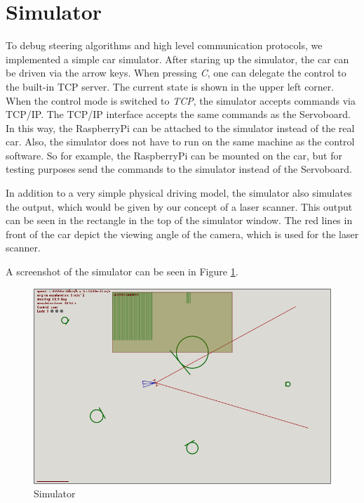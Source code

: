 \documentclass[a4paper
               ,10pt
               ,DIV=10 %
               ,BCOR=0.3cm
               ,pagesize %
               ,headings=small
               ,bibtotoc
               ]
               {scrartcl}
\begin{document}
\section{Simulator}

To debug steering algorithms and high level communication protocols, we implemented a simple car simulator.
After staring up the simulator, the car can be driven via the arrow keys. When pressing \textit{C}, one can delegate the control to the built-in TCP server. The current state is shown in the upper left corner.
When the control mode is switched to \textit{TCP}, the simulator accepts commands via TCP/IP.
The TCP/IP interface accepts the same commands as the Servoboard.
In this way, the RaspberryPi can be attached to the simulator instead of the real car.
Also, the simulator does not have to run on the same machine as the control software.
So for example, the RaspberryPi can be mounted on the car, but for testing purposes send the commands to the simulator instead of the Servoboard.

In addition to a very simple physical driving model, the simulator also simulates the output, which would be given by our concept of a laser scanner. This output can be seen in the rectangle in the top of the simulator window. The red lines in front of the car depict the viewing angle of the camera, which is used for the laser scanner.

A screenshot of the simulator can be seen in Figure \ref{figsim}.

\begin{figure}[H]
\begin{center}
\includegraphics[width=15cm]{pic/sim.png}
\end{center}
\caption{Simulator}
\label{figsim}
\end{figure}
\end{document}
